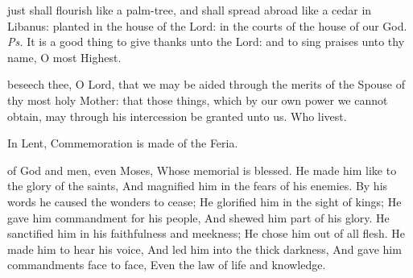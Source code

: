 \introit
{} just shall flourish like a palm-tree, and shall spread abroad like a cedar in Libanus: planted in the house of the Lord: in the courts of the house of our God. \textit{Ps.} It is a good thing to give thanks unto the Lord: and to sing praises unto thy name, O most Highest.

\collect
{} beseech thee, O Lord, that we may be aided through the merits of the Spouse of thy most holy Mother: that those things, which by our own power we cannot obtain, may through his intercession be granted unto us. Who livest.
\begin{rubric}
    In Lent, Commemoration is made of the Feria.
\end{rubric}

 of God and men, even Moses, Whose memorial is blessed. He made him like to the glory of the saints, And magnified him in the fears of his enemies. By his words he caused the wonders to cease; He glorified him in the sight of kings; He gave him commandment for his people, And shewed him part of his glory. He sanctified him in his faithfulness and meekness; He chose him out of all flesh. He made him to hear his voice, And led him into the thick darkness, And gave him commandments face to face, Even the law of life and knowledge.


